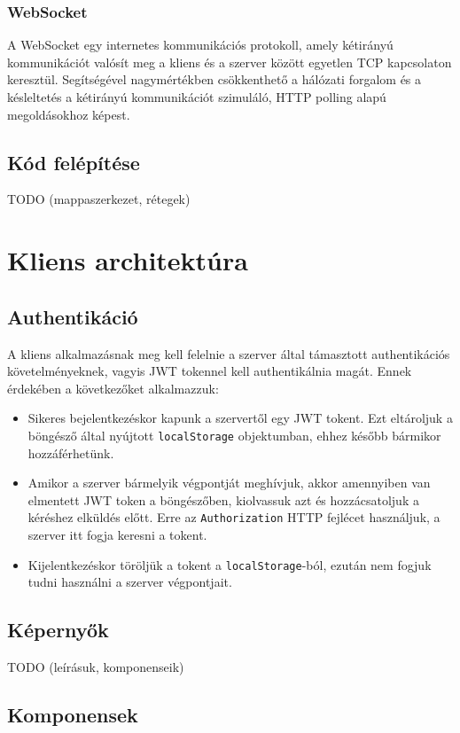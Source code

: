 \documentclass{elteikthesis}
\begin{document}
				\subsubsection{WebSocket}
					A WebSocket \cite{websocket} egy internetes kommunikációs protokoll, amely kétirányú kommunikációt valósít meg a kliens és a szerver között egyetlen TCP kapcsolaton keresztül. Segítségével nagymértékben csökkenthető a hálózati forgalom és a késleltetés a kétirányú kommunikációt szimuláló, HTTP polling alapú megoldásokhoz képest.

			\subsection{Kód felépítése}
			TODO (mappaszerkezet, rétegek)
		
		\section{Kliens architektúra}

			\subsection{Authentikáció}
				A kliens alkalmazásnak meg kell felelnie a szerver által támasztott authentikációs követelményeknek, vagyis JWT tokennel kell authentikálnia magát. Ennek érdekében a következőket alkalmazzuk:
				\begin{itemize}
					\item Sikeres bejelentkezéskor kapunk a szervertől egy JWT tokent. Ezt eltároljuk a böngésző által nyújtott \texttt{localStorage} objektumban, ehhez később bármikor hozzáférhetünk.
					\item Amikor a szerver bármelyik végpontját meghívjuk, akkor amennyiben van elmentett JWT token a böngészőben, kiolvassuk azt és hozzácsatoljuk a kéréshez elküldés előtt. Erre az \texttt{Authorization} HTTP fejlécet használjuk, a szerver itt fogja keresni a tokent.
					\item Kijelentkezéskor töröljük a tokent a \texttt{localStorage}-ból, ezután nem fogjuk tudni használni a szerver végpontjait.
				\end{itemize}
			
			\subsection{Képernyők}
			TODO (leírásuk, komponenseik)
			
			\subsection{Komponensek}
\end{document}
